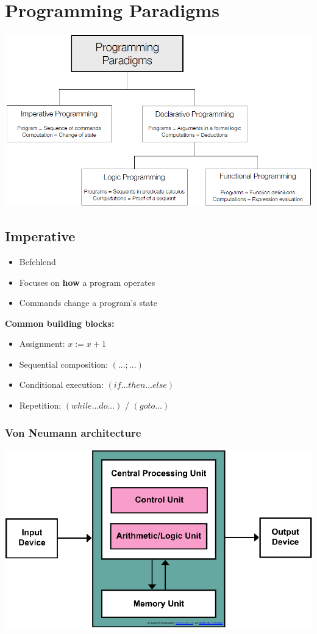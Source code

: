 \section{Programming Paradigms}
\includegraphics[width=\linewidth]{img/programming_paradigms.png}
\subsection{Imperative}
\begin{itemize}
    \item Befehlend
    \item Focuses on \textbf{how} a program operates
    \item Commands change a program's state
\end{itemize}
\textbf{Common building blocks:}
\begin{itemize}
    \item Assignment: $x := x + 1$
    \item Sequential composition: $(... ; ...)$
    \item Conditional execution: $(if ... then ... else)$
    \item Repetition: $(while ... do ...)$ / $(goto ...)$
\end{itemize}
\subsubsection{Von Neumann architecture}
\includegraphics[width=0.7\linewidth]{img/imperative_programming.png}\\

